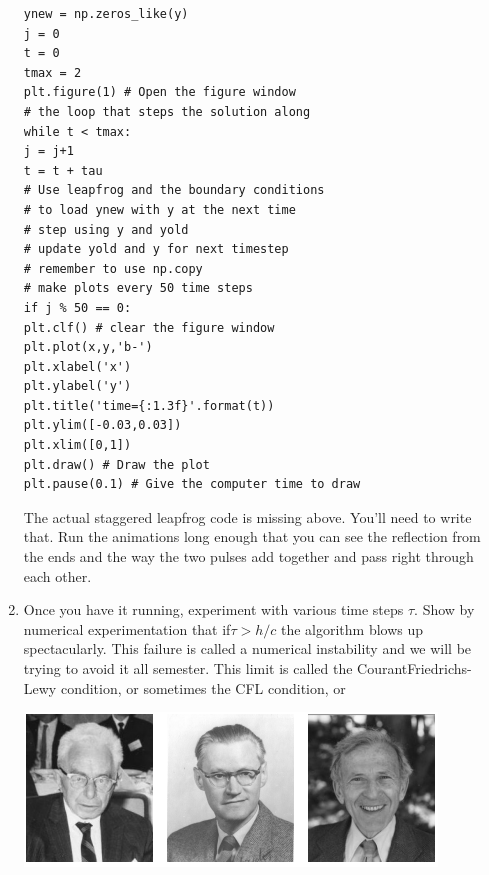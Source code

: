 \documentclass{book}
\theoremstyle{plain}
\theoremstyle{definition}
\numberwithin{exm}{chapter}
\theoremstyle{remark}
\theoremstyle{summary}
\theoremstyle{overview}
\begin{document}
\begin{enumerate}[label=(\alph*)]
\begin{lstlisting}
ynew = np.zeros_like(y)
j = 0
t = 0
tmax = 2
plt.figure(1) # Open the figure window
# the loop that steps the solution along
while t < tmax:
j = j+1
t = t + tau
# Use leapfrog and the boundary conditions
# to load ynew with y at the next time
# step using y and yold
# update yold and y for next timestep
# remember to use np.copy
# make plots every 50 time steps
if j % 50 == 0:
plt.clf() # clear the figure window
plt.plot(x,y,'b-')
plt.xlabel('x')
plt.ylabel('y')
plt.title('time={:1.3f}'.format(t))
plt.ylim([-0.03,0.03])
plt.xlim([0,1])
plt.draw() # Draw the plot
plt.pause(0.1) # Give the computer time to draw
\end{lstlisting}
The actual staggered leapfrog code is missing above. You’ll need to
write that. Run the animations long enough that you can see the
reflection from the ends and the way the two pulses add together and
pass right through each other.
\item Once you have it running, experiment with various time steps $\tau$. Show
by numerical experimentation that if$ \tau > h/c$ the algorithm blows up
spectacularly. This failure is called a numerical instability and we
will be trying to avoid it all semester. This limit is called the CourantFriedrichs-Lewy condition, or sometimes the CFL condition, or 

\includegraphics[width=\marginparwidth]{fig52}



\end{enumerate}
\end{document}
